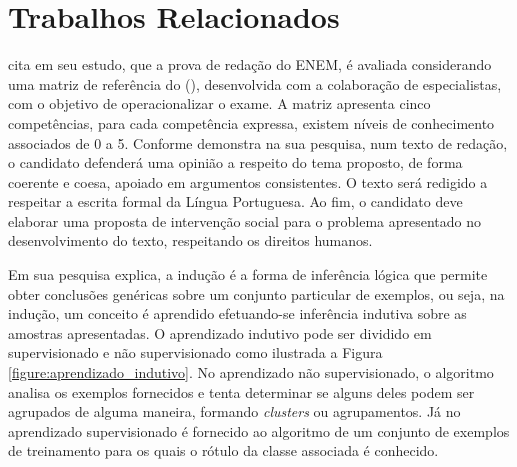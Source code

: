 \section{Trabalhos Relacionados}
\label{section:trabalhos_relacionados}

 cita em seu estudo, que a prova de redação do 
ENEM, é avaliada considerando uma matriz de referência do 
\citeauthor{edital_enem:2016} (\citeyear{edital_enem:2016}), desenvolvida com a 
colaboração de especialistas, com o objetivo de operacionalizar o exame. A 
matriz apresenta cinco competências, para cada competência expressa, 
existem níveis de conhecimento associados de 0 a 5. Conforme 
 demonstra na sua pesquisa, num texto de redação, o 
candidato defenderá uma opinião a respeito do tema proposto, de forma coerente 
e coesa, apoiado em argumentos consistentes. O texto será redigido a respeitar 
a escrita formal da Língua Portuguesa. Ao fim, o candidato deve elaborar uma 
proposta de intervenção social para o problema apresentado no desenvolvimento 
do texto, respeitando os direitos humanos.

Em sua pesquisa  explica, a indução é a 
forma de inferência lógica que permite obter conclusões genéricas sobre um 
conjunto particular de exemplos, ou seja, na indução, um conceito é aprendido 
efetuando-se inferência indutiva sobre as amostras apresentadas. O aprendizado 
indutivo pode ser dividido em supervisionado e não supervisionado como 
ilustrada a Figura \ref{figure:aprendizado_indutivo}. No aprendizado não 
supervisionado, o algoritmo analisa os exemplos fornecidos e tenta determinar 
se alguns deles podem ser agrupados de alguma maneira, formando 
\textit{clusters} ou agrupamentos. Já no aprendizado supervisionado é fornecido 
ao algoritmo de um conjunto de exemplos de treinamento para os quais o rótulo 
da classe associada é conhecido.

